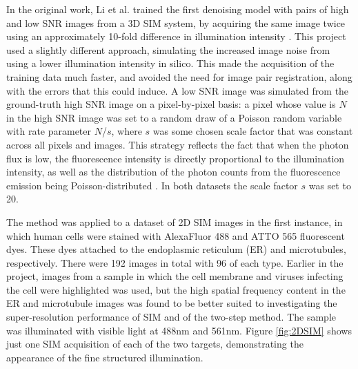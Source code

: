 \documentclass[12pt]{article}
\begin{document}
In the original work, Li et al. trained the first denoising model with pairs of high and low SNR images from a 3D SIM system,
by acquiring the same image twice using an approximately 10-fold difference in illumination intensity \cite{keypaper}.
This project used a slightly different approach,
simulating the increased image noise from using a lower illumination intensity in silico.
This made the acquisition of the training data much faster,
and avoided the need for image pair registration, along with the errors that this could induce.
A low SNR image was simulated from the ground-truth high SNR image on a pixel-by-pixel basis:
a pixel whose value is $N$ in the high SNR image was set to a random draw of a Poisson random variable with rate parameter $N$/$s$,
where $s$ was some chosen scale factor that was constant across all pixels and images.
This strategy reflects the fact that when the photon flux is low,
the fluorescence intensity is directly proportional to the illumination intensity,
as well as the distribution of the photon counts from the fluorescence emission being Poisson-distributed \cite{fluorescence}.
In both datasets the scale factor $s$ was set to 20.

The method was applied to a dataset of 2D SIM images in the first instance,
in which human cells were stained with AlexaFluor 488 and ATTO 565 fluorescent dyes.
These dyes attached to the endoplasmic reticulum (ER) and microtubules, respectively.
There were 192 images in total with 96 of each type.
Earlier in the project, images from a sample in which the cell membrane and viruses infecting the cell were highlighted was used,
but the high spatial frequency content in the ER and microtubule images was found to be better suited to investigating the super-resolution performance of SIM and of the two-step method.
The sample was illuminated with visible light at 488nm and 561nm.
Figure \ref{fig:2DSIM} shows just one SIM acquisition of each of the two targets,
demonstrating the appearance of the fine structured illumination.
\end{document}
